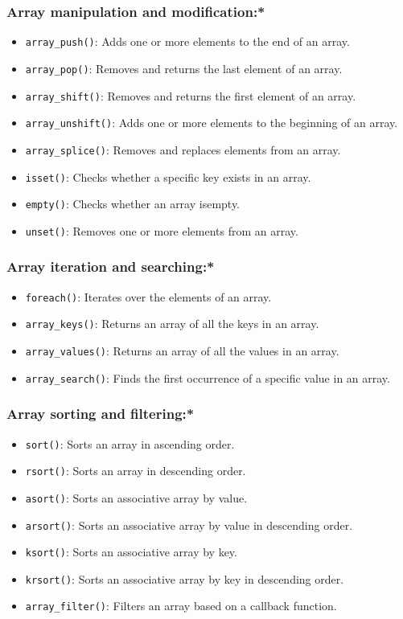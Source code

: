 \documentclass[11pt]{article}
\begin{document}
\subsubsection{Array manipulation and modification:*}
\label{sec:org6c55f78}
\begin{itemize}
\item \texttt{array\_push()}: Adds one or more elements to the end of an array.
\item \texttt{array\_pop()}: Removes and returns the last element of an array.
\item \texttt{array\_shift()}: Removes and returns the first element of an array.
\item \texttt{array\_unshift()}: Adds one or more elements to the beginning of an array.
\item \texttt{array\_splice()}: Removes and replaces elements from an array.
\item \texttt{isset()}: Checks whether a specific key exists in an array.
\item \texttt{empty()}: Checks whether an array isempty.
\item \texttt{unset()}: Removes one or more elements from an array.
\end{itemize}

\subsubsection{Array iteration and searching:*}
\label{sec:org04383c9}
\begin{itemize}
\item \texttt{foreach()}: Iterates over the elements of an array.
\item \texttt{array\_keys()}: Returns an array of all the keys in an array.
\item \texttt{array\_values()}: Returns an array of all the values in an array.
\item \texttt{array\_search()}: Finds the first occurrence of a specific value in an array.
\end{itemize}

\subsubsection{Array sorting and filtering:*}
\label{sec:orge676bb2}
\begin{itemize}
\item \texttt{sort()}: Sorts an array in ascending order.
\item \texttt{rsort()}: Sorts an array in descending order.
\item \texttt{asort()}: Sorts an associative array by value.
\item \texttt{arsort()}: Sorts an associative array by value in descending order.
\item \texttt{ksort()}: Sorts an associative array by key.
\item \texttt{krsort()}: Sorts an associative array by key in descending order.
\item \texttt{array\_filter()}: Filters an array based on a callback function.
\end{itemize}
\end{document}

